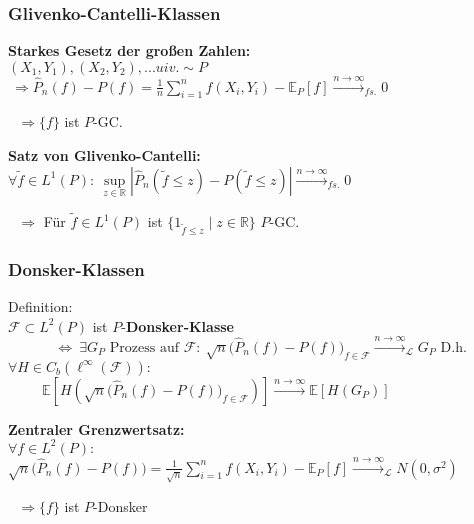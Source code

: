 \documentclass{beamer}
\newcommand{\R}{\mathbb{R}} %
\newcommand{\E}{\mathbb{E}} %
\newcommand{\F}{\mathcal{F}}
\begin{document}
	\begin{frame}
		\frametitle{Glivenko-Cantelli-Klassen}
		\begin{mdframed}
			\textbf{Starkes Gesetz der großen Zahlen:}\\
			$(X_1,Y_1),(X_2,Y_2),...uiv. \sim P$\\
			$ \ \Rightarrow \hat{P}_n(f) - P(f) = \frac{1}{n}\sum\limits_{i=1}^n f(X_i,Y_i)-\E_P[f] \xrightarrow{n \rightarrow \infty}_{fs.} 0$
		\end{mdframed}
		$ \ \ \ \Rightarrow \{f\}$ ist $P$-GC.
		\hfill\break
		\begin{mdframed}
			\textbf{Satz von Glivenko-Cantelli:}\\
			$\forall \widetilde{f} \in L^1(P) : \ \sup\limits_{z \in \R} |\hat{P}_n(\widetilde{f} \leq z)- P(\widetilde{f} \leq z)| \xrightarrow{n \rightarrow \infty}_{fs.} 0$
		\end{mdframed}
		$ \ \ \ \Rightarrow $ Für $\widetilde{f} \in L^1(P)$ ist $\{ 1_{\widetilde{f} \leq z} \mid z \in \R \}$ $P$-GC.
	\end{frame}
	
	\begin{frame}
		\frametitle{Donsker-Klassen}
		Definition:\\
		$\F \subset L^2(P)$ ist $P$-\textbf{Donsker-Klasse}\\
		$ \ \ \ \ \ \ \ \ \ \ \ \ \ \ \ \Leftrightarrow \ \exists G_P \text{ Prozess auf } \F : \ \sqrt{n}\big( \hat{P}_n(f)-P(f) \big)_{f \in \F} \xrightarrow{n \rightarrow \infty}_{\mathcal{L}} G_P$
		\hfill\break
		\hfill\break
		D.h. $\forall H \in C_b(\ell^\infty(\F)) :$\\
		$ \ \ \ \ \ \ \ \ \ \ \ \E\left[ H\left(\sqrt{n}\big( \hat{P}_n(f)-P(f) \big)_{f \in \F}\right) \right] \xrightarrow{n \rightarrow \infty} \E[H\left(G_P\right)]$
		\pause
		\begin{mdframed}
			\textbf{Zentraler Grenzwertsatz:}\\
			$\forall f \in L^2(P) :$\\
			$\sqrt{n}\big( \hat{P}_n(f)-P(f) \big) = \frac{1}{\sqrt{n}} \sum\limits_{i=1}^n f(X_i,Y_i)-\E_P[f] \xrightarrow{n \rightarrow \infty}_{\mathcal{L}} N(0,\sigma^2)$
		\end{mdframed}
		$ \ \ \ \Rightarrow \{f\}$ ist $P$-Donsker
	\end{frame}
	
\end{document}
